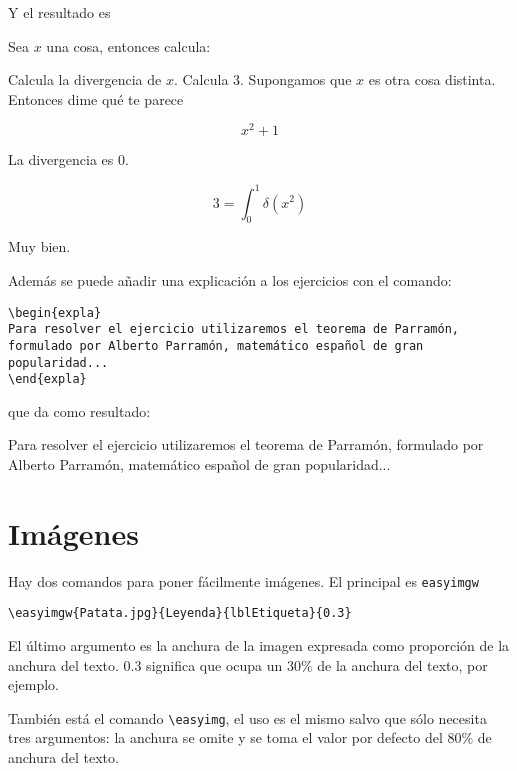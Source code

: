 \documentclass[nochap]{apuntes}
\begin{document}
Y el resultado es

\begin{problem}[3]
Sea $x$ una cosa, entonces calcula:

\ppart Calcula la divergencia de $x$.
\ppart Calcula 3.
\ppart Supongamos que $x$ es otra cosa distinta. Entonces dime qué te parece

\[ x^2 + 1 \]

\solution

\spart La divergencia es 0.

\spart

\[ 3 = \int_0^1 δ(x^2) \]

\spart  Muy bien.

\end{problem}

 Además se puede añadir una explicación a los ejercicios con el comando:
\begin{verbatim}
\begin{expla}
Para resolver el ejercicio utilizaremos el teorema de Parramón, formulado por Alberto Parramón, matemático español de gran popularidad...
\end{expla}
\end{verbatim}

 que da como resultado:
\begin{expla}
Para resolver el ejercicio utilizaremos el teorema de Parramón, formulado por Alberto Parramón, matemático español de gran popularidad...
\end{expla}

\section{Imágenes}

Hay dos comandos para poner fácilmente imágenes. El principal es \texttt{easyimgw}

\begin{verbatim}
\easyimgw{Patata.jpg}{Leyenda}{lblEtiqueta}{0.3}
\end{verbatim}

El último argumento es la anchura de la imagen expresada como proporción de la anchura del texto. $0.3$ significa que ocupa un $30\%$ de la anchura del texto, por ejemplo.


También está el comando \verb|\easyimg|, el uso es el mismo salvo que sólo necesita tres argumentos: la anchura se omite y se toma el valor por defecto del $80\%$ de anchura del texto.
\end{document}
